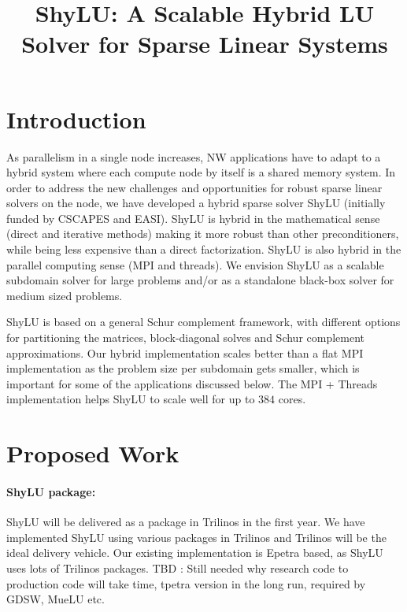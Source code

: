 \documentclass[10pt]{amsart}
\date{}
\title{ShyLU: A Scalable Hybrid LU Solver for Sparse Linear Systems}
\begin{document}
\maketitle

\section{Introduction}

As parallelism in a single node increases, NW applications
have to adapt to a hybrid system where each compute node by itself
is a shared memory system. 
In order to address the new challenges and opportunities 
for robust sparse linear solvers on the node,
we have developed a hybrid sparse solver ShyLU (initially funded by CSCAPES
and EASI). ShyLU is hybrid in the
mathematical sense (direct and iterative methods) making it more
robust than other preconditioners, while being less expensive
than a direct factorization.  ShyLU is also hybrid in the parallel
computing sense (MPI and threads). We envision ShyLU as a scalable
subdomain solver for large problems and/or as a standalone black-box solver
for medium sized problems.

ShyLU is based on a general Schur complement framework, with different options
for partitioning the matrices, block-diagonal solves and Schur complement
approximations.  Our hybrid implementation scales better than
a flat MPI implementation as the problem size per subdomain gets smaller, which
is important for some of the applications discussed below.
The MPI + Threads implementation helps ShyLU to scale well for up
to $384$ cores.

\section{Proposed Work}

\paragraph{\bf{ShyLU package}:}
ShyLU will be delivered as a package in Trilinos in the first year.
We have implemented ShyLU using various packages in Trilinos and Trilinos will
be the ideal delivery vehicle. Our existing implementation is Epetra based,
as ShyLU uses lots of Trilinos packages.
TBD : Still needed why research code to production code will take time, tpetra
version in the long run, required by GDSW, MueLU etc.
\end{document}
